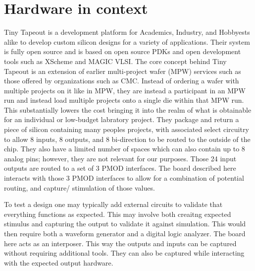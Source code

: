 \section{Hardware in context}

Tiny Tapeout is a development platform for Academics, Industry, and Hobbyests alike to develop custom silicon designs for a variety of applications.
Their system is fully open source and is based on open source PDKs and open development tools such as XScheme and MAGIC VLSI. 
The core concept behind Tiny Tapeout is an extension of earlier multi-project wafer (MPW) services such as those offered by organizations such as CMC. 
Instead of ordering a wafer with multiple projects on it like in MPW, they are instead a participant in an MPW run and instead load multiple projects onto a single die within that MPW run. 
This substantially lowers the cost bringing it into the realm of what is obtainable for an individual or low-budget labratory project. 
They package and return a piece of silicon containing many peoples projects, with associated select circuitry to allow 8 inputs, 8 outputs, and 8 bi-direction to be routed to the outside of the chip.
They also have a limited number of spaces which can also contain up to 8 analog pins; however, they are not relevant for our purposes. 
Those 24 input outputs are routed to a set of 3 PMOD interfaces. 
The board described here interacts with those 3 PMOD interfaces to allow for a combination of potential routing, and capture/ stimulation of those values. 


To test a design one may typically add external circuits to validate that everything functions as expected. 
This may involve both creaitng expected stimulus and capturing the output to validate it against simulation. 
This would then require both a waveform generator and a digital logic analyzer. 
The board here acts as an interposer. 
This way the outputs and inputs can be captured without requiring additional tools. 
They can also be captured while interacting with the expected output hardware. 
